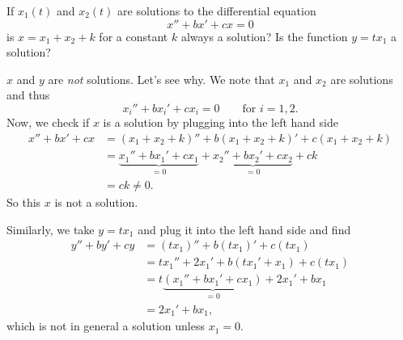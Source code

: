 \documentclass[12pt]{article} %
\begin{document}
\newpage
\begin{problem}
If $x_1(t)$ and $x_2(t)$ are solutions to the differential equation
\[
x'' + bx' +cx = 0
\]
is $x=x_1+x_2+k$ for a constant $k$ always a solution? Is the function $y=tx_1$ a solution? 
\end{problem}
\begin{solution}
$x$ and $y$ are \emph{not} solutions.  Let's see why.  We note that $x_1$ and $x_2$ are solutions and thus
\[
x_i''+bx_i'+cx_i=0\qquad \textrm{for $i=1,2$}.
\]
Now, we check if $x$ is a solution by plugging into the left hand side
\begin{align*}
    x''+bx'+cx&= (x_1+x_2+k)''+b(x_1+x_2+k)'+c(x_1+x_2+k)\\
    &= \underbrace{x_1''+bx_1'+cx_1}_{=0}+ \underbrace{x_2''+bx_2'+cx_2}_{=0}+ck\\
    &= ck \neq 0.
\end{align*}
So this $x$ is not a solution. 

Similarly, we take $y=tx_1$ and plug it into the left hand side and find
\begin{align*}
    y''+by'+cy&=(tx_1)''+b(tx_1)'+c(tx_1)\\
    &=tx_1''+2x_1'+ b(tx_1'+x_1)+c(tx_1)\\
    &= t\underbrace{(x_1''+bx_1'+cx_1)}_{=0}+2x_1'+bx_1\\
    &=2x_1'+bx_1,
\end{align*}
which is not in general a solution unless $x_1=0$.  
\end{solution}
\end{document}
